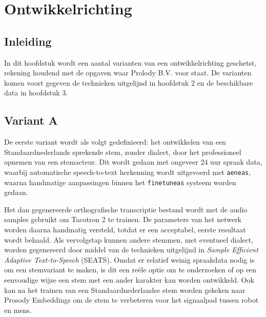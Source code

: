 \chapter{Ontwikkelrichting}

\section{Inleiding}
In dit hoofdstuk wordt een aantal varianten van een ontwikkelrichting geschetst, rekening houdend met de opgaven waar Prolody B.V. voor staat. De varianten komen voort gegeven de technieken uitgelijnd in hoofdstuk 2 en de beschikbare data in hoofdstuk 3.

\section{Variant A}
De eerste variant wordt als volgt gedefinieerd: het ontwikkelen van een Standaardnederlands sprekende stem, zonder dialect, door het professioneel opnemen van een stemacteur. Dit wordt gedaan met ongeveer 24 uur spraak data, waarbij automatische speech-to-text herkenning wordt uitgevoerd met \texttt{aeneas}, waarna handmatige aanpassingen binnen het \texttt{finetuneas} systeem worden gedaan.

Het dan gegenereerde orthografische transcriptie bestand wordt met de audio samples gebruikt om Tacotron 2 te trainen. De parameters van het netwerk worden daarna handmatig versteld, totdat er een acceptabel, eerste resultaat wordt behaald. Als vervolgstap kunnen andere stemmen, met eventueel dialect, worden gegenereerd door middel van de technieken uitgelijnd in \textit{Sample Efficient Adaptive Text-to-Speech} (SEATS). Omdat er relatief weinig spraakdata nodig is om een stemvariant te maken, is dit een reële optie om te onderzoeken of op een eenvoudige wijze een stem met een ander karakter kan worden ontwikkeld. Ook kan na het trainen van een Standaardnederlandse stem worden gekeken naar Prosody Embeddings om de stem te verbeteren voor het signaalpad tussen robot en mens.

